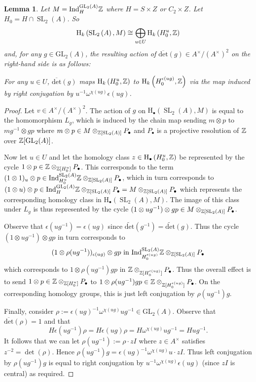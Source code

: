 \documentclass[12pt]{amsart}
\newtheorem{lem}{Lemma}[section]
\theoremstyle{definition}
\newcommand{\Z}{\Bbb{Z}}
\newcommand{\spl}[2]{\operatorname{SL}_{#1}\left(#2\right)}
\newcommand{\gl}[2]{\mathrm{GL}_{#1}(#2)}
\newcommand{\<}{\langle}
\renewcommand{\>}{\rangle}
\newcommand{\odet}{\overline{\mathrm{det}}}
\newcommand{\oodet}{\widetilde{\mathrm{det}}}
\newcommand{\ho}[3]{\mathrm{H}_{#1}\left( #2,#3 \right)}
\newcommand{\Ind}[3]{\mathrm{Ind}_{#1}^{#2}#3}
\begin{document}
\begin{lem}\label{lem:raact} Let $M=\Ind{H}{\gl{2}{A}}\Z$ where $H=S\times Z$ or $C_2\times Z$. Let $H_0=H\cap \spl{2}{A}$. So 
\[
\ho{k}{\spl{2}{A}}{M}\cong\bigoplus_{u\in U}\ho{k}{H_0^u}{\Z}
\]
and, for any $g\in\gl{2}{A}$, the resulting action of $\odet(g)\in A^\times/(A^\times)^2$ on the right-hand side is as follows: 

For any $u\in U$, $\odet(g)$ maps $\ho{k}{H_0^u}{\Z}$ to $\ho{k}{H_0^{\epsilon(ug)}}{\Z}$ via the map induced by right conjugation by $u^{-1}\omega^{\chi(ug)}\epsilon(ug)$. 
\end{lem}
\begin{proof}  Let  $v\in A^\times/(A^\times)^2$.  The action of $g$ on $\ho{\bullet}{\spl{2}{A}}{M}$ is equal to the homomorphism $L_g$, which is induced by the chain map sending  $m\otimes p$ to $mg^{-1}\otimes gp$  where $m\otimes p\in M\otimes_{\Z[\spl{2}{A}]}P_\bullet$ and $P_\bullet$ is a projective resolution of $\Z$ over $\Z[\gl{2}{A}]$.

Now let $u\in U$ and let the homology class $z\in\ho{\bullet}{H_0^u}{\Z}$ be represented by the cycle $1\otimes p\in \Z\otimes_{\Z[H_0^u]}P_\bullet$. This corresponds to the term
$(1\otimes 1)_u\otimes p\in \Ind{H_0^u}{\spl{2}{A}}\Z\otimes_{\Z[\spl{2}{A}]}P_\bullet$, which in turn corresponds to $(1\otimes u)\otimes p\in \Ind{H}{\gl{2}{A}}\Z\otimes_{\Z[\spl{2}{A}]}P_\bullet=M\otimes_{\Z[\spl{2}{A}]}P_\bullet$ which represents the corresponding homology class in $\ho{\bullet}{\spl{2}{A}}{M}$. The image of this class under $L_g$ is thus represented by 
the cycle $(1\otimes ug^{-1})\otimes gp\in M\otimes_{\Z[\spl{2}{A}]}P_\bullet$. 

Observe that $\epsilon(ug^{-1})=\epsilon(ug)$ since $\oodet(g^{-1})=\oodet(g)$. Thus the cycle $(1\otimes ug^{-1})\otimes gp$ in turn corresponds to 
\[
(1\otimes \rho(ug^{-1}))_{\epsilon(ug)}\otimes gp \mbox{ in }\Ind{H_0^{\epsilon(ug)}}{\spl{2}{A}}\Z\otimes_{\Z[\spl{2}{A}]}P_\bullet
\]
 which corresponds to 
$1\otimes \rho(ug^{-1})gp$ in $\Z\otimes_{\Z[H_0^{\epsilon(ug)}]}P_\bullet$. Thus the overall effect is to send $1\otimes p\in \Z\otimes_{\Z[H_0^u]}P_\bullet$ to 
$1\otimes \rho(ug^{-1})gp\in \Z\otimes_{\Z[H_0^{\epsilon(ug)}]}P_\bullet$. On the corresponding homology groups, this is just left conjugation by $\rho(ug^{-1})g$.

Finally, consider $\rho:=\epsilon(ug)^{-1}\omega^{\chi(ug)}ug^{-1}\in \gl{2}{A}$. Observe that $\odet(\rho)=1$ and that 
\[
H\epsilon(ug^{-1})\rho=H\epsilon(ug)\rho=H\omega^{\chi(ug)}ug^{-1}=Hug^{-1}.
\]
It follows that we can let $\rho(ug^{-1}):=\rho \cdot zI$ where $z\in A^\times$ satisfies $z^{-2}=\det(\rho)$. Hence $\rho(ug^{-1})g=\epsilon(ug)^{-1}\omega^{\chi(ug)}u\cdot zI$. Thus left conjugation by $\rho(ug^{-1})g$ is equal to right conjugation by $u^{-1}\omega^{\chi(ug)}\epsilon(ug)$ (since $zI$ is central) as required.
\end{proof}
\end{document}
